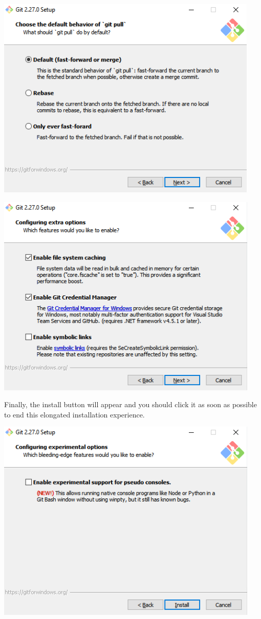 \documentclass[
]{book}
\begin{document}
\includegraphics{images/05-git_11.png}

\includegraphics{images/05-git_12.png}

Finally, the install button will appear and you should click it as soon as possible to end this elongated installation experience.

\includegraphics{images/05-git_13.png}
\end{document}
